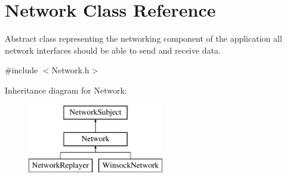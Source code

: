 \hypertarget{classNetwork}{
\section{Network Class Reference}
\label{classNetwork}
}


Abstract class representing the networking component of the application all network interfaces should be able to send and receive data.  




{\ttfamily \#include $<$Network.h$>$}

Inheritance diagram for Network:\begin{figure}[H]
\begin{center}
\leavevmode
\includegraphics[height=3.000000cm]{classNetwork}
\end{center}
\end{figure}
